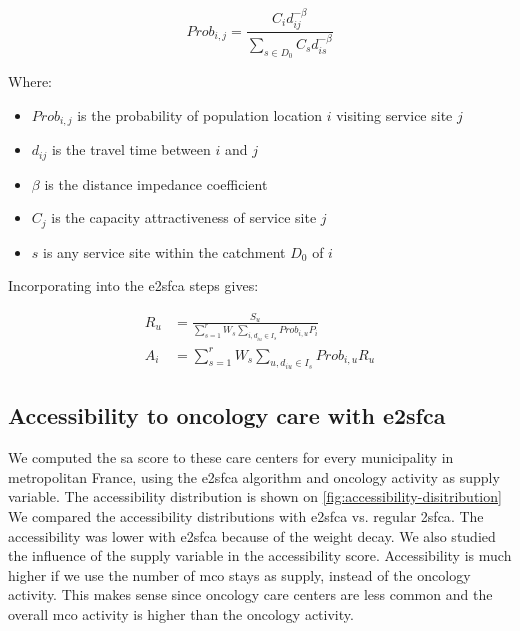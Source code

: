 \begin{equation}
    Prob_{i,j} = \frac{C_i d_{ij}^{-\beta}}{\sum_{s \in D_0} C_s d_{is}^{-\beta}}
\end{equation}

Where:

\begin{itemize}
    \item $Prob_{i,j}$ is the probability of population location $i$ visiting
          service site $j$
    \item $d_{ij}$ is the travel time between $i$ and $j$
    \item $\beta$ is the distance impedance coefficient
    \item $C_j$ is the capacity \/ attractiveness of service site $j$
    \item $s$ is any service site within the catchment $D_0$ of $i$
\end{itemize}

Incorporating into the \ac{e2sfca} steps gives:

\begin{align}
    R_u & =  \frac{S_u}{\sum_{s=1}^{r} W_s \sum_{i, d_{iu} \in I_s} Prob_{i,u} P_i} \\
    A_i & = \sum_{s=1}^{r} W_s \sum_{u, d_{iu} \in I_s} Prob_{i,u} R_u
\end{align}

\subsection{Accessibility to oncology care with \ac{e2sfca}}

We computed the \ac{sa} score to these care centers for every municipality in
metropolitan France, using the \ac{e2sfca} algorithm and oncology activity as
supply variable. The accessibility distribution is shown on
\cref{fig:accessibility-disitribution} We compared the accessibility
distributions with \ac{e2sfca} vs. regular \ac{2sfca}. The accessibility was
lower with \ac{e2sfca} because of the weight decay. We also studied the
influence of the supply variable in the accessibility score. Accessibility is
much higher if we use the number of \ac{mco} stays as supply, instead of the
oncology activity. This makes sense since oncology care centers are less common
and the overall \ac{mco} activity is higher than the oncology activity.

